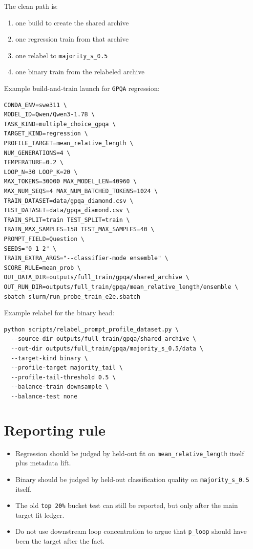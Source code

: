 \documentclass[11pt]{article}
\begin{document}
The clean path is:
\begin{enumerate}[leftmargin=1.5em]
\item one build to create the shared archive
\item one regression train from that archive
\item one relabel to \texttt{majority\_s\_0.5}
\item one binary train from the relabeled archive
\end{enumerate}

Example build-and-train launch for \texttt{GPQA} regression:

\begin{verbatim}
CONDA_ENV=swe311 \
MODEL_ID=Qwen/Qwen3-1.7B \
TASK_KIND=multiple_choice_gpqa \
TARGET_KIND=regression \
PROFILE_TARGET=mean_relative_length \
NUM_GENERATIONS=4 \
TEMPERATURE=0.2 \
LOOP_N=30 LOOP_K=20 \
MAX_TOKENS=30000 MAX_MODEL_LEN=40960 \
MAX_NUM_SEQS=4 MAX_NUM_BATCHED_TOKENS=1024 \
TRAIN_DATASET=data/gpqa_diamond.csv \
TEST_DATASET=data/gpqa_diamond.csv \
TRAIN_SPLIT=train TEST_SPLIT=train \
TRAIN_MAX_SAMPLES=158 TEST_MAX_SAMPLES=40 \
PROMPT_FIELD=Question \
SEEDS="0 1 2" \
TRAIN_EXTRA_ARGS="--classifier-mode ensemble" \
SCORE_RULE=mean_prob \
OUT_DATA_DIR=outputs/full_train/gpqa/shared_archive \
OUT_RUN_DIR=outputs/full_train/gpqa/mean_relative_length/ensemble \
sbatch slurm/run_probe_train_e2e.sbatch
\end{verbatim}

Example relabel for the binary head:

\begin{verbatim}
python scripts/relabel_prompt_profile_dataset.py \
  --source-dir outputs/full_train/gpqa/shared_archive \
  --out-dir outputs/full_train/gpqa/majority_s_0.5/data \
  --target-kind binary \
  --profile-target majority_tail \
  --profile-tail-threshold 0.5 \
  --balance-train downsample \
  --balance-test none
\end{verbatim}

\section*{Reporting rule}

\begin{itemize}[leftmargin=1.5em]
\item Regression should be judged by held-out fit on \texttt{mean\_relative\_length} itself plus metadata lift.
\item Binary should be judged by held-out classification quality on \texttt{majority\_s\_0.5} itself.
\item The old \texttt{top 20\%} bucket test can still be reported, but only after the main target-fit ledger.
\item Do not use downstream loop concentration to argue that \texttt{p\_loop} should have been the target after the fact.
\end{itemize}
\end{document}
